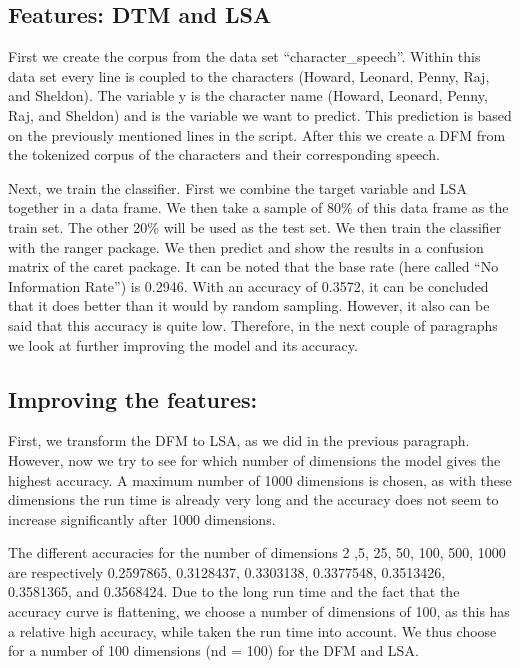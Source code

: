 \documentclass[
]{article}
\begin{document}
\hypertarget{features-dtm-and-lsa}{%
\subsection{Features: DTM and LSA}\label{features-dtm-and-lsa}}

First we create the corpus from the data set ``character\_speech''.
Within this data set every line is coupled to the characters (Howard,
Leonard, Penny, Raj, and Sheldon). The variable y is the character name
(Howard, Leonard, Penny, Raj, and Sheldon) and is the variable we want
to predict. This prediction is based on the previously mentioned lines
in the script. After this we create a DFM from the tokenized corpus of
the characters and their corresponding speech.

Next, we train the classifier. First we combine the target variable and
LSA together in a data frame. We then take a sample of 80\% of this data
frame as the train set. The other 20\% will be used as the test set. We
then train the classifier with the ranger package. We then predict and
show the results in a confusion matrix of the caret package. It can be
noted that the base rate (here called ``No Information Rate'') is
0.2946. With an accuracy of 0.3572, it can be concluded that it does
better than it would by random sampling. However, it also can be said
that this accuracy is quite low. Therefore, in the next couple of
paragraphs we look at further improving the model and its accuracy.

\hypertarget{improving-the-features}{%
\subsection{Improving the features:}\label{improving-the-features}}

First, we transform the DFM to LSA, as we did in the previous paragraph.
However, now we try to see for which number of dimensions the model
gives the highest accuracy. A maximum number of 1000 dimensions is
chosen, as with these dimensions the run time is already very long and
the accuracy does not seem to increase significantly after 1000
dimensions.

The different accuracies for the number of dimensions 2 ,5, 25, 50, 100,
500, 1000 are respectively 0.2597865, 0.3128437, 0.3303138, 0.3377548,
0.3513426, 0.3581365, and 0.3568424. Due to the long run time and the
fact that the accuracy curve is flattening, we choose a number of
dimensions of 100, as this has a relative high accuracy, while taken the
run time into account. We thus choose for a number of 100 dimensions (nd
= 100) for the DFM and LSA.
\end{document}
